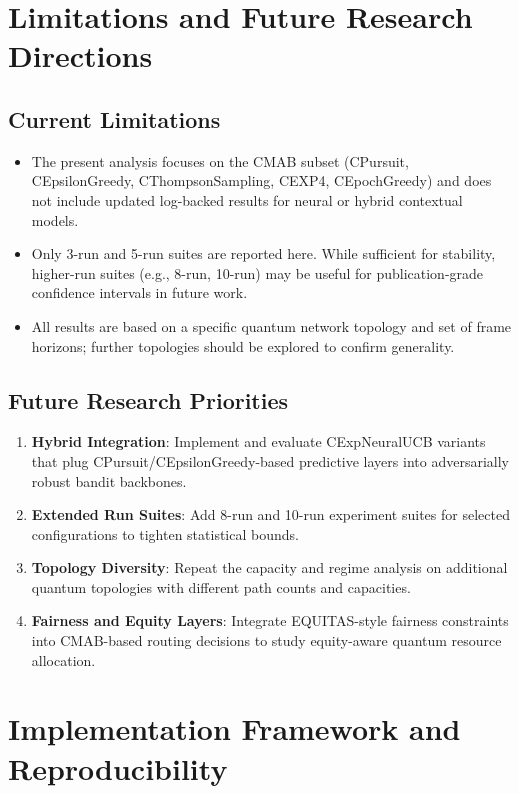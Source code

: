 \documentclass[12pt,a4paper]{article}
\begin{document}
\section{Limitations and Future Research Directions}

\subsection{Current Limitations}

\begin{itemize}
\item The present analysis focuses on the CMAB subset (CPursuit, CEpsilonGreedy, CThompsonSampling, CEXP4, CEpochGreedy) and does not include updated log-backed results for neural or hybrid contextual models.
\item Only 3-run and 5-run suites are reported here. While sufficient for stability, higher-run suites (e.g., 8-run, 10-run) may be useful for publication-grade confidence intervals in future work.
\item All results are based on a specific quantum network topology and set of frame horizons; further topologies should be explored to confirm generality.
\end{itemize}

\subsection{Future Research Priorities}

\begin{enumerate}
\item \textbf{Hybrid Integration}: Implement and evaluate CExpNeuralUCB variants that plug CPursuit/CEpsilonGreedy-based predictive layers into adversarially robust bandit backbones.
\item \textbf{Extended Run Suites}: Add 8-run and 10-run experiment suites for selected configurations to tighten statistical bounds.
\item \textbf{Topology Diversity}: Repeat the capacity and regime analysis on additional quantum topologies with different path counts and capacities.
\item \textbf{Fairness and Equity Layers}: Integrate EQUITAS-style fairness constraints into CMAB-based routing decisions to study equity-aware quantum resource allocation.
\end{enumerate}

\section{Implementation Framework and Reproducibility}
\end{document}
